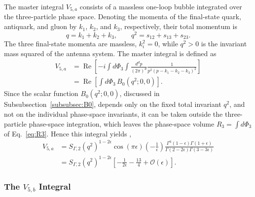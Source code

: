 The master integral $V_{5,a}$ consists of a massless one-loop bubble integrated over the
three-particle phase space. Denoting the momenta of the final-state quark, antiquark, and
gluon by $k_1$, $k_2$, and $k_3$, respectively, their total momentum is
\begin{equation*}
    q=k_1+k_2+k_3,\qquad q^2=s_{12}+s_{13}+s_{23}.
\end{equation*}
The three final-state momenta are massless, $k_i^2=0$, while $q^2>0$ is the invariant mass
squared of the antenna system. The master integral is defined as
\begin{equation}
    \begin{split}
        V_{5,a} &= \operatorname{Re}\!\left[-i\int d\Phi_3\int\frac{d^dp}{(2\pi)^d}\frac1{p^2(p-k_1-k_2-k_3)^2}\right]\\
                &= \operatorname{Re}\!\left[\int d\Phi_3\,B_0\!\left(q^2;0,0\right)\right].
    \end{split}
\end{equation}
Since the scalar function $B_0\!\left(q^2;0,0\right)$, discussed in
Subsubsection~\ref{subsubsec:B0}, depends only on the fixed total invariant $q^2$, and not
on the individual phase-space invariants, it can be taken outside the three-particle
phase-space integration, which leaves the phase-space volume $R_3=\int d\Phi_3$ of
Eq.~\eqref{eq:R3}. Hence this integral yields \cite{Gehrmann-DeRidder:2005btv},
\begin{equation}
    \begin{split}
        V_{5,a} &= S_{\Gamma,2}\!\left(q^2\right)^{1-2\epsilon}\cos(\pi\epsilon)\!\left(-\frac1\epsilon\right)\frac{\Gamma^6(1-\epsilon)\Gamma(1+\epsilon)}{\Gamma(2-2\epsilon)\Gamma(3-3\epsilon)}\\
                &= S_{\Gamma,2}\!\left(q^2\right)^{1-2\epsilon}\!\left[-\frac1{2\epsilon}-\frac{13}4+\mathcal O(\epsilon)\right].
    \end{split}
\end{equation}

\subsubsection*{The $V_{5,b}$ Integral}

